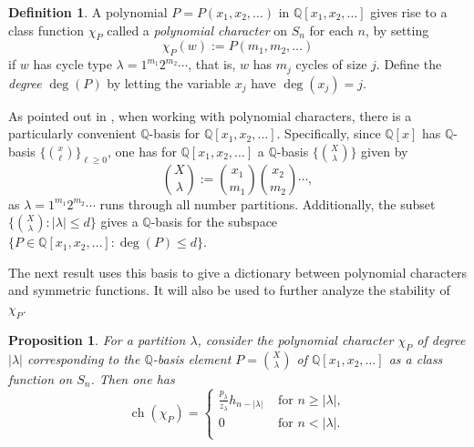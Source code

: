 \documentclass[12pt]{amsart}
\theoremstyle{plain}
\newtheorem{prop}[thm]{Proposition}
\theoremstyle{definition}
\newtheorem{defn}[thm]{Definition}
\begin{document}
\begin{defn}
A polynomial $P=P(x_1,x_2,\ldots)$ in ${{\mathbb Q}}[x_1,x_2,\ldots]$ 
gives rise to a class function $\chi_P$ called a {\it polynomial character} 
on $S_n$ for each $n$, by setting
$$
\chi_P(w):= P(m_1,m_2,\ldots)
$$
if $w$ has cycle type $\lambda=1^{m_1} 2^{m_2} \cdots$, that is, $w$ has
$m_j$ cycles of size $j$.  
Define the {\it degree} $\deg(P)$ 
by letting the variable $x_j$ have $\deg(x_j)=j$.  
\end{defn}

\noindent
As pointed out in \cite[\S 3.4]{CEF2}, when working with
polynomial characters, there is a particularly convenient ${{\mathbb Q}}$-basis 
for ${{\mathbb Q}}[x_1,x_2,\ldots]$.  Specifically, since
${{\mathbb Q}}[x]$ has ${{\mathbb Q}}$-basis $\{ \binom{x}{\ell} \}_{\ell \geq 0}$, one
has for ${{\mathbb Q}}[x_1,x_2,\ldots]$ a ${{\mathbb Q}}$-basis 
$\{ \binom{X}{\lambda} \}$ given by
$$
\binom{X}{\lambda}:=\binom{x_1}{m_1} \binom{x_2}{m_2} \cdots,
$$
as $\lambda=1^{m_1} 2^{m_2} \cdots$ runs through all number partitions.
Additionally, the subset 
$
\{ \binom{X}{\lambda} :|\lambda| \leq d\}
$
gives a ${{\mathbb Q}}$-basis for the subspace 
$\{P \in {{\mathbb Q}}[x_1,x_2,\ldots]: \deg(P) \leq d\}$.

The next result uses this basis to give a dictionary between
polynomial characters and symmetric functions.  It will also
be used to further analyze the stability of $\chi_P$.

 
\begin{prop}
\label{polynomial-character-as-symmetric-function}
For a partition $\lambda$, consider the polynomial character 
$\chi_P$ of degree $|\lambda|$ corresponding to the
${{\mathbb Q}}$-basis element $P=\binom{X}{\lambda}$ of ${{\mathbb Q}}[x_1,x_2,\ldots]$
as a class function on $S_n$.  Then one has
\begin{equation}
{{\operatorname{ch}}}(\chi_P)= 
\begin{cases}
\displaystyle \frac{p_\lambda}{z_\lambda} h_{n-|\lambda|} & \text{ for }n \geq |\lambda|,\\
0 & \text{ for }n < |\lambda|.\\
\end{cases}
\end{equation}
\end{prop}
\end{document}
